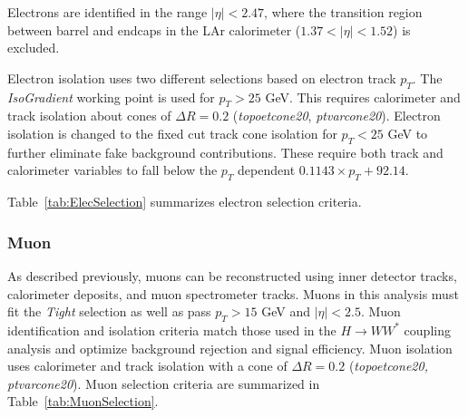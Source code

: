 Electrons are identified in the range $|\eta|<2.47$, where the transition region between barrel and endcaps in the LAr calorimeter ($1.37<|\eta|<1.52$) is excluded.

Electron isolation uses two different selections based on electron track $p_T$. The \textit{IsoGradient} working point is used for $p_T>25$ GeV. This requires calorimeter and track isolation about cones of $\Delta R =0.2$ (\textit{topoetcone20}, \textit{ptvarcone20}). Electron isolation is changed to the fixed cut track cone isolation for $p_T <25$ GeV to further eliminate fake background contributions. These require both track and calorimeter variables to fall below the $p_T$ dependent $0.1143\times p_T + 92.14$. 

Table~\ref{tab:ElecSelection} summarizes electron selection criteria.

\begin{table}[h!]
  \centering
  \caption{Electron selections}
  \label{tab:ElecSelection}
\end{table}

\subsubsection{Muon}

As described previously, muons can be reconstructed using inner detector tracks, calorimeter deposits, and muon spectrometer tracks. Muons in this analysis must fit the \textit{Tight} selection as well as pass $p_T>15$ GeV and $|\eta|<2.5$. Muon identification and isolation criteria match those used in the $H\rightarrow WW^*$ coupling analysis and optimize background rejection and signal efficiency. Muon isolation uses calorimeter and track isolation with a cone of $\Delta R=0.2$ (\textit{topoetcone20, ptvarcone20}). 
Muon selection criteria are summarized in Table~\ref{tab:MuonSelection}. 

